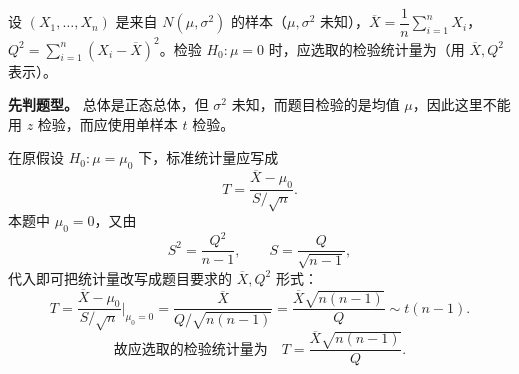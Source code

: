 ﻿\documentclass[lang=cn,11pt]{elegantbook}
\begin{document}
\begin{exercise}[检验统计量的表达式] \label{ex:ht_stat}
设 \((X_1,\dots,X_n)\) 是来自 \(N(\mu,\sigma^2)\) 的样本（\(\mu,\sigma^2\) 未知），\(\overline{X}=\dfrac{1}{n}\displaystyle\sum_{i=1}^{n}X_i\)，\(Q^2=\displaystyle\sum_{i=1}^{n}(X_i-\overline{X})^2\)。检验 \(H_0\colon\mu=0\) 时，应选取的检验统计量为\underline{\qquad}（用 \(\overline{X},Q^2\) 表示）。
\end{exercise}
\begin{solution}
\textbf{先判题型。} 总体是正态总体，但 \(\sigma^2\) 未知，而题目检验的是均值 \(\mu\)，因此这里不能用 \(z\) 检验，而应使用单样本 \(t\) 检验。

在原假设 \(H_0\colon \mu=\mu_0\) 下，标准统计量应写成
\[
T=\frac{\overline{X}-\mu_0}{S/\sqrt{n}}.
\]
本题中 \(\mu_0=0\)，又由
\[
S^2=\frac{Q^2}{n-1},\qquad S=\frac{Q}{\sqrt{n-1}},
\]
代入即可把统计量改写成题目要求的 \(\overline{X},Q^2\) 形式：
\[
T=\frac{\overline{X}-\mu_0}{S/\sqrt{n}}\bigg|_{\mu_0=0}
=\frac{\overline{X}}{Q/\sqrt{n(n-1)}}=\frac{\overline{X}\sqrt{n(n-1)}}{Q}\sim t(n-1).
\]
\[
\text{故应选取的检验统计量为}\quad T=\frac{\overline{X}\sqrt{n(n-1)}}{Q}.
\]
\end{solution}
\end{document}
